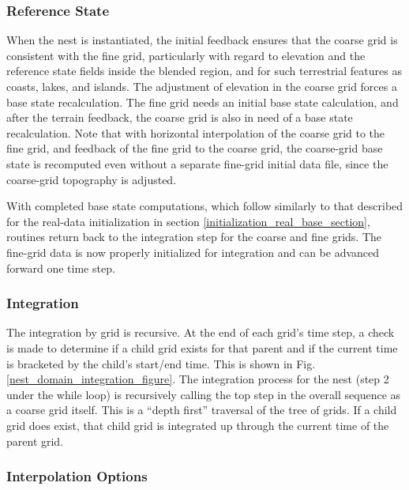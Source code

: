 \subsubsection{Reference State}
When the nest is instantiated, the initial feedback ensures
that the coarse grid is consistent with the fine grid, particularly 
with regard to elevation and the reference state fields inside the blended region, and for such 
terrestrial features as coasts, lakes, and islands.  The adjustment 
of elevation in the coarse grid forces a base state recalculation.  
The fine grid needs an initial base state calculation, and after
the terrain feedback, the coarse grid is also in need of a base state
recalculation.  Note that with horizontal interpolation of the coarse grid 
to the fine grid, and feedback of the fine grid to the coarse 
grid, the coarse-grid base state is recomputed 
even without a separate fine-grid initial data file, 
since the coarse-grid topography is adjusted.

With completed base state computations, which follow similarly to
that described for the real-data initialization in section
\ref{initialization_real_base_section},
routines return 
back to the integration step for the coarse and fine grids.
The fine-grid data is now properly initialized for integration and
can be advanced forward one time step.

\subsubsection{Integration}

The integration by grid is recursive.  At the end of each grid's time step, a check
is made to determine if a child grid exists for that parent and if the
current time is bracketed by the child's start/end time.  
This is shown in Fig. \ref{nest_domain_integration_figure}.  The integration process for the nest (step 2 under the
while loop) is recursively calling the top step in the overall sequence as a coarse grid itself.
This is a ``depth first'' 
traversal of the tree of grids.
If a child grid does exist, that child grid is integrated up through the current time of 
the parent grid.

\subsubsection{Interpolation Options}


